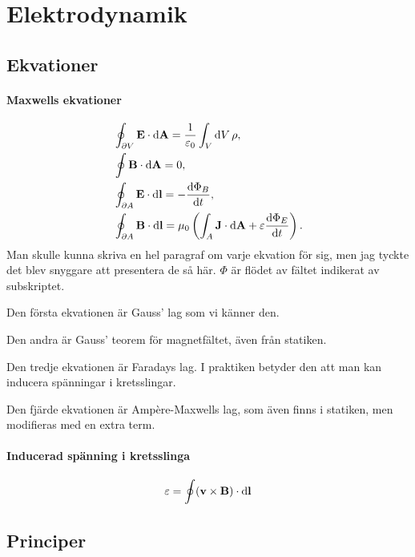 \section{Elektrodynamik}

\subsection{Ekvationer}

\paragraph{Maxwells ekvationer}
\begin{align*}
	&\oint_{\partial V}\vect{E}\cdot\dd{\vect{A}} = \frac{1}{\varepsilon_0}\int_{V}\dd{V}\rho, \\
	&\oint\vect{B}\cdot\dd{\vect{A}} = 0, \\
	&\oint_{\partial A}\vect{E}\cdot\dd{\vect{l}} = -\dv{\Phi_{B}}{t}, \\
	&\oint_{\partial A}\vect{B}\cdot\dd{\vect{l}} = \mu_0\left(\int_{A}\vect{J}\cdot\dd{\vect{A}} + \varepsilon\dv{\Phi_{E}}{t}\right).
\end{align*}
Man skulle kunna skriva en hel paragraf om varje ekvation för sig, men jag tyckte det blev snyggare att presentera de så här. $\Phi$ är flödet av fältet indikerat av subskriptet.

Den första ekvationen är Gauss' lag som vi känner den.

Den andra är Gauss' teorem för magnetfältet, även från statiken.

Den tredje ekvationen är Faradays lag. I praktiken betyder den att man kan inducera spänningar i kretsslingar.

Den fjärde ekvationen är Ampère-Maxwells lag, som även finns i statiken, men modifieras med en extra term.

\paragraph{Inducerad spänning i kretsslinga}
\begin{align*}
	\varepsilon = \oint(\vect{v}\times\vect{B})\cdot\dd{\vect{l}}
\end{align*} 

\subsection{Principer}

